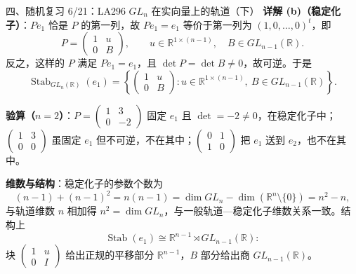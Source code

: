 \documentclass[aspectratio=169,10pt,fontset=none]{ctexbeamer}
\newcommand{\key}[1]{\textcolor{ink}{\bfseries #1}}
\begin{document}
\begin{frame}[t]{四、随机复习 6/21：LA296 $GL_n$ 在实向量上的轨道（下）}
\scriptsize
\key{详解 (b)（稳定化子）}：$Pe_1$ 恰是 $P$ 的第一列，故 $Pe_1=e_1$ 等价于第一列为 $(1,0,\dots,0)^t$，即
\[ P=\begin{pmatrix}1&u\\0&B\end{pmatrix},\qquad u\in\mathbb R^{1\times(n-1)},\quad B\in GL_{n-1}(\mathbb R). \]
反之，这样的 $P$ 满足 $Pe_1=e_1$，且 $\det P=\det B\ne0$，故可逆。于是
\[ \operatorname{Stab}_{GL_n(\mathbb R)}(e_1)=\left\{\begin{pmatrix}1&u\\0&B\end{pmatrix}:u\in\mathbb R^{1\times(n-1)},\ B\in GL_{n-1}(\mathbb R)\right\}. \]

\key{验算（$n=2$）}：$P=\begin{pmatrix}1&3\\0&-2\end{pmatrix}$ 固定 $e_1$ 且 $\det=-2\ne0$，在稳定化子中；$\begin{pmatrix}1&3\\0&0\end{pmatrix}$ 虽固定 $e_1$ 但不可逆，不在其中；$\begin{pmatrix}0&1\\1&0\end{pmatrix}$ 把 $e_1$ 送到 $e_2$，也不在其中。

\key{维数与结构}：稳定化子的参数个数为
\[ (n-1)+(n-1)^2=n(n-1)=\dim GL_n-\dim(\mathbb R^n\setminus\{0\})=n^2-n, \]
与轨道维数 $n$ 相加得 $n^2=\dim GL_n$，与一般轨道—稳定化子维数关系一致。结构上
\[ \operatorname{Stab}(e_1)\cong\mathbb R^{n-1}\rtimes GL_{n-1}(\mathbb R): \]
块 $\begin{pmatrix}1&u\\0&I\end{pmatrix}$ 给出正规的平移部分 $\mathbb R^{n-1}$，$B$ 部分给出商 $GL_{n-1}(\mathbb R)$。
\end{frame}
\end{document}
